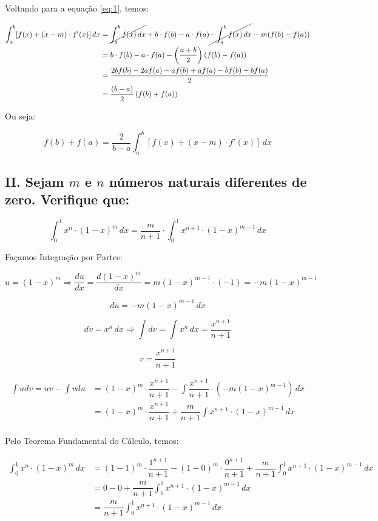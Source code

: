 \documentclass{article}
\begin{document}
Voltando para a equação \eqref{eq:1}, temos:

\begin{align*}
    \int_a^b [f(x) + (x-m) \cdot f'(x)] \, dx
     & =
    \cancel{\int_a^b f(x) \, dx} + b \cdot f(b) - a \cdot f(a) \cancel{- \int_a^b f(x) \, dx}  - m (f(b) - f(a))
    \\
     & = b \cdot f(b) - a \cdot f(a) - \left(\dfrac{a+b}{2}\right) (f(b) - f(a))
    \\
     & = \dfrac{2bf(b)-2af(a)-af(b)+af(a)-bf(b)+bf(a)}{2}
    \\
     & = \dfrac{(b-a)}{2} \left(f(b) + f(a)\right)
\end{align*}

Ou seja:

\[
    f(b) + f(a) = \dfrac{2}{b-a} \int_a^b [f(x) + (x-m) \cdot f'(x)] \, dx
\]

\subsection*{II. Sejam \(m\) e \(n\) números naturais diferentes de zero. Verifique que:}

\[
    \int_0^1 x^n \cdot (1-x)^m \, dx =
    \dfrac{m}{n+1} \cdot \int_0^1 x^{n+1} \cdot (1-x)^{m-1} \, dx
\]

Façamos Integração por Partes:

\[
    u = (1-x)^m \Rightarrow \dfrac{du}{dx}
    = \dfrac{d(1-x)^m}{dx}
    = m(1-x)^{m-1} \cdot (-1) = -m(1-x)^{m-1}
\]

\[
    du = -m(1-x)^{m-1} \, dx
\]

\[
    dv = x^n \, dx \Rightarrow \int dv = \int x^n \, dx = \dfrac{x^{n+1}}{n+1}
\]

\[
    v = \dfrac{x^{n+1}}{n+1}
\]

\begin{align*}
    \int udv = uv - \int vdu
     & = (1-x)^m \cdot \dfrac{x^{n+1}}{n+1} - \int \dfrac{x^{n+1}}{n+1} \cdot (-m(1-x)^{m-1}) \, dx \\
     & = (1-x)^m \cdot \dfrac{x^{n+1}}{n+1} + \dfrac{m}{n+1} \int x^{n+1} \cdot (1-x)^{m-1} \, dx   \\
\end{align*}

Pelo Teorema Fundamental do Cálculo, temos:

\begin{align*}
    \int_0^1 x^n \cdot (1-x)^m \, dx
     & = (1-1)^m \cdot \dfrac{1^{n+1}}{n+1} - (1-0)^m \cdot \dfrac{0^{n+1}}{n+1}
    + \dfrac{m}{n+1} \int_0^1 x^{n+1} \cdot (1-x)^{m-1} \, dx                    \\
     & = 0 - 0 + \dfrac{m}{n+1} \int_0^1 x^{n+1} \cdot (1-x)^{m-1} \, dx
    \\
     & = \dfrac{m}{n+1} \int_0^1 x^{n+1} \cdot (1-x)^{m-1} \, dx
\end{align*}
\end{document}
